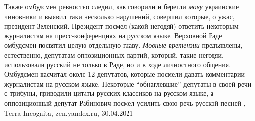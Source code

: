 Также омбудсмен ревностно следил, как говорили и берегли \emph{мову} украинские
чиновники и выявил таки несколько нарушений, совершил которые, о ужас,
президент Зеленский. Президент посмел (какой негодяй) ответить некоторым
журналистам на пресс-конференциях на русском языке.  Верховной Раде омбудсмен
посвятил целую отдельную главу. \emph{Мовные претензии} предъявлены, естественно,
депутатам оппозиционных партий, который, такие негодяи, использовали русский не
только в Раде, но и в ходе личностного общения. Омбудсмен насчитал около 12
депутатов, которые посмели давать комментарии журналистам на русском языке.
Некоторые \enquote{обнаглевшие} депутаты в своей речи с трибуны, приводили цитаты
русских классиков на русском языке, а оппозиционный депутат Рабинович посмел
усилить свою речь русской песней
, 
Terra Incognita, zen.yandex.ru, 30.04.2021
